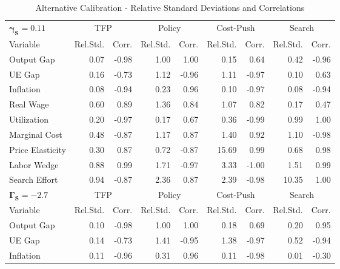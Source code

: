 \documentclass[12pt,3p,authoryear,review]{elsarticle}
\begin{document}
\pagebreak%
\begin{table}[h!]%
	\begin{center}%
		\begin{footnotesize}%
			\caption{Alternative Calibration - Relative Standard Deviations and Correlations}\label{tab:simul_stats_app}%
			\begin{tabular}{l r r r r r r r r}%
				\hline%
				$\boldsymbol{\gamma_S = 0.11}$ & \multicolumn{2}{c}{TFP} & \multicolumn{2}{c}{Policy} & \multicolumn{2}{c}{Cost-Push} & \multicolumn{2}{c}{Search}\\%
				Variable & Rel.Std. & Corr. & Rel.Std. & Corr. & Rel.Std. & Corr. & Rel.Std. & Corr.\\%
				\hline \hline%
				Output Gap & 0.07 & -0.98 & 1.00 & 1.00 & 0.15 & 0.64 & 0.42 & -0.96\\%
				UE Gap & 0.16 & -0.73 & 1.12 & -0.96 & 1.11 & -0.97 & 0.10 & 0.63\\%
				Inflation & 0.08 & -0.94 & 0.23 & 0.96 & 0.10 & -0.97 & 0.08 & -0.94\\%
				Real Wage & 0.60& 0.89 & 1.36 & 0.84 & 1.07 & 0.82 & 0.17 & 0.47\\%
				Utilization & 0.20 & -0.97 & 0.17 & 0.67 & 0.36 & -0.99 & 0.99 & 1.00\\%
				Marginal Cost & 0.48 & -0.87 & 1.17 & 0.87 & 1.40 & 0.92 & 1.10 & -0.98\\%
				Price Elasticity & 0.30 & 0.87 & 0.72 & -0.87 & 15.69 & 0.99 & 0.68 & 0.98\\%
				Labor Wedge & 0.88 & 0.99 & 1.71 & -0.97 & 3.33 & -1.00 & 1.51 & 0.99\\%
				Search Effort & 0.94 & -0.87 & 2.36 & 0.87 & 2.39 & -0.98 & 10.35 & 1.00\\%
				\hline%
				\hline%
				$\boldsymbol{\Gamma_S = -2.7}$ & \multicolumn{2}{c}{TFP} & \multicolumn{2}{c}{Policy} & \multicolumn{2}{c}{Cost-Push} & \multicolumn{2}{c}{Search}\\%
				Variable & Rel.Std. & Corr. & Rel.Std. & Corr. & Rel.Std. & Corr. & Rel.Std. & Corr.\\%
				\hline \hline%
				Output Gap & 0.10 & -0.98 & 1.00 & 1.00 & 0.18 & 0.69 & 0.20 & 0.95\\%
				UE Gap & 0.14 & -0.73 & 1.41 & -0.95 & 1.38 & -0.97 & 0.52 & -0.94\\%
				Inflation & 0.11 & -0.96 & 0.31 & 0.96 & 0.11 & -0.98 & 0.01 & -0.30\\%

\end{tabular}
\end{footnotesize}
\end{center}
\end{table}
\end{document}
